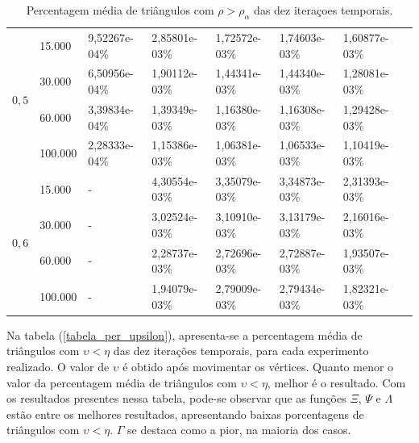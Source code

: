 \begin{table}[!ht]
\begin{center}
\begin{tabular}{|l|l|l|l|l|l|l|l|}
\hline %
\multirow{4}{*}{$0,5$}
& 15.000 & 9,52267e-04\% & 2,85801e-03\% & 1,72572e-03\% & 1,74603e-03\% & 1,60877e-03\% \\
& 30.000 & 6,50956e-04\% & 1,90112e-03\% & 1,44341e-03\% & 1,44340e-03\% & 1,28081e-03\% \\
& 60.000 & 3,39834e-04\% & 1,39349e-03\% & 1,16380e-03\% & 1,16308e-03\% & 1,29428e-03\% \\
& 100.000 & 2,28333e-04\% & 1,15386e-03\% & 1,06381e-03\% & 1,06533e-03\% & 1,10419e-03\% \\
\hline %
\multirow{4}{*}{$0,6$}
& 15.000 & - & 4,30554e-03\% & 3,35079e-03\% & 3,34873e-03\% & 2,31393e-03\% \\
& 30.000 & - & 3,02524e-03\% & 3,10910e-03\% & 3,13179e-03\% & 2,16016e-03\% \\
& 60.000 & - & 2,28737e-03\% & 2,72696e-03\% & 2,72887e-03\% & 1,93507e-03\% \\
& 100.000 & - & 1,94079e-03\% & 2,79009e-03\% & 2,79434e-03\% & 1,82321e-03\% \\
\hline %
\end{tabular}%
\end{center}
\caption{Percentagem média de triângulos com $\rho > \rho_{\alpha}$ das dez iteraçoes temporais.} %
\label{tabela_per_rho}
\end{table}

Na tabela (\ref{tabela_per_upsilon}), apresenta-se a percentagem média de triângulos com $\upsilon < \eta$ das dez iterações temporais, para cada experimento realizado. O valor de $\upsilon$ é obtido após movimentar os vértices. Quanto menor o valor da percentagem média de triângulos com $\upsilon < \eta$, melhor é o resultado. Com os resultados presentes nessa tabela, pode-se observar que as funções $\Xi$, $\Psi$ e $\Lambda$ estão entre os melhores resultados, apresentando baixas porcentagens de triângulos com $\upsilon < \eta$. $\Gamma$ se destaca como a pior, na maioria dos casos.

